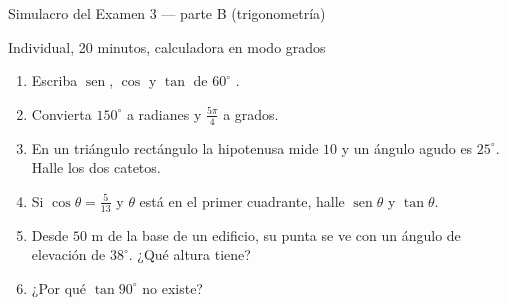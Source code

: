 \documentclass[aspectratio=169,10pt]{beamer}
\begin{document}
\begin{frame}{Simulacro del Examen 3 — parte B (trigonometría)}
  \begin{alertblock}{Individual, 20 minutos, calculadora en modo grados}
    \scriptsize
    \begin{enumerate}\setlength{\itemsep}{0.03cm}
      \setcounter{enumi}{6}
      \item Escriba $\operatorname{sen}$, $\cos$ y $\tan$ de $60^{\circ}$
            .
      \item Convierta $150^{\circ}$ a radianes y $\frac{5\pi}{4}$ a grados.
      \item En un triángulo rectángulo la hipotenusa mide $10$ y un ángulo
            agudo es $25^{\circ}$. Halle los dos catetos.
      \item Si $\cos\theta=\frac{5}{13}$ y $\theta$ está en el primer
            cuadrante, halle $\operatorname{sen}\theta$ y $\tan\theta$.
      \item Desde $50$ m de la base de un edificio, su punta se ve con un
            ángulo de elevación de $38^{\circ}$. ¿Qué altura tiene?
      \item ¿Por qué $\tan 90^{\circ}$ no existe?
    \end{enumerate}
  \end{alertblock}
\end{frame}
\end{document}
